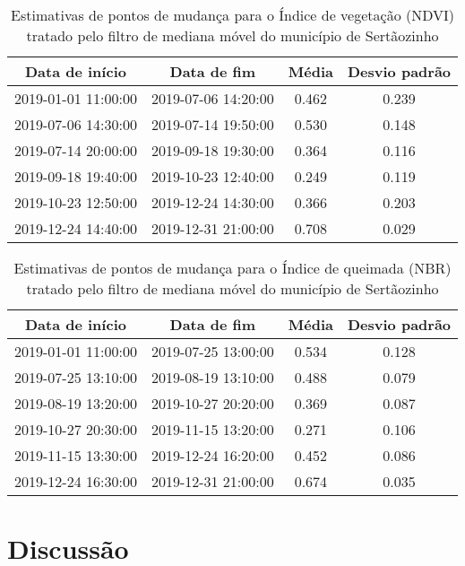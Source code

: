\documentclass[11pt,brazil,]{article}
\begin{document}
\begin{table}[t]

\caption{\label{tab:unnamed-chunk-5}\label{ndvi_med}Estimativas de pontos de mudança para o Índice de vegetação (NDVI) tratado pelo filtro de mediana móvel do município de Sertãozinho}
\centering
\begin{tabular}{cccc}
\toprule
Data de início & Data de fim & Média & Desvio padrão\\
\midrule
2019-01-01 11:00:00 & 2019-07-06 14:20:00 & 0.462 & 0.239\\
2019-07-06 14:30:00 & 2019-07-14 19:50:00 & 0.530 & 0.148\\
2019-07-14 20:00:00 & 2019-09-18 19:30:00 & 0.364 & 0.116\\
2019-09-18 19:40:00 & 2019-10-23 12:40:00 & 0.249 & 0.119\\
2019-10-23 12:50:00 & 2019-12-24 14:30:00 & 0.366 & 0.203\\
2019-12-24 14:40:00 & 2019-12-31 21:00:00 & 0.708 & 0.029\\
\bottomrule
\end{tabular}
\end{table}

\begin{table}[t]

\caption{\label{tab:unnamed-chunk-5}\label{nbr_med}Estimativas de pontos de mudança para o Índice de queimada (NBR) tratado pelo filtro de mediana móvel do município de Sertãozinho}
\centering
\begin{tabular}{cccc}
\toprule
Data de início & Data de fim & Média & Desvio padrão\\
\midrule
2019-01-01 11:00:00 & 2019-07-25 13:00:00 & 0.534 & 0.128\\
2019-07-25 13:10:00 & 2019-08-19 13:10:00 & 0.488 & 0.079\\
2019-08-19 13:20:00 & 2019-10-27 20:20:00 & 0.369 & 0.087\\
2019-10-27 20:30:00 & 2019-11-15 13:20:00 & 0.271 & 0.106\\
2019-11-15 13:30:00 & 2019-12-24 16:20:00 & 0.452 & 0.086\\
2019-12-24 16:30:00 & 2019-12-31 21:00:00 & 0.674 & 0.035\\
\bottomrule
\end{tabular}
\end{table}

\hypertarget{discussao}{%
\section{Discussão}\label{discussao}}
\end{document}
